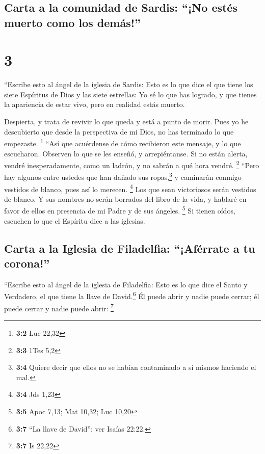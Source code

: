 \hypertarget{carta-a-la-comunidad-de-sardis-no-estuxe9s-muerto-como-los-demuxe1s}{%
\subsection{Carta a la comunidad de Sardis: ``¡No estés muerto como los
demás!''}\label{carta-a-la-comunidad-de-sardis-no-estuxe9s-muerto-como-los-demuxe1s}}

\hypertarget{section-2}{%
\section{3}\label{section-2}}

 ``Escribe esto al ángel de la iglesia de Sardis: Esto es
lo que dice el que tiene los siete Espíritus de Dios y las siete
estrellas: Yo sé lo que has logrado, y que tienes la apariencia de estar
vivo, pero en realidad estás muerto.

 Despierta, y trata de revivir lo que queda y está a punto
de morir. Pues yo he descubierto que desde la perspectiva de mi Dios, no
has terminado lo que empezaste. \footnote{\textbf{3:2} Luc 22,32}
 ``Así que acuérdense de cómo recibieron este mensaje, y
lo que escucharon. Observen lo que se les enseñó, y arrepiéntanse. Si no
están alerta, vendré inesperadamente, como un ladrón, y no sabrán a qué
hora vendré. \footnote{\textbf{3:3} 1Tes 5,2}  ``Pero hay
algunos entre ustedes que han dañado sus ropas,\footnote{\textbf{3:4}
  Quiere decir que ellos no se habían contaminado a sí mismos haciendo
  el mal.} y caminarán conmigo vestidos de blanco, pues así lo merecen.
\footnote{\textbf{3:4} Jds 1,23}  Los que sean victoriosos
serán vestidos de blanco. Y sus nombres no serán borrados del libro de
la vida, y hablaré en favor de ellos en presencia de mi Padre y de sus
ángeles. \footnote{\textbf{3:5} Apoc 7,13; Mat 10,32; Luc 10,20}
 Si tienen oídos, escuchen lo que el Espíritu dice a las
iglesias.

\hypertarget{carta-a-la-iglesia-de-filadelfia-afuxe9rrate-a-tu-corona}{%
\subsection{Carta a la Iglesia de Filadelfia: ``¡Aférrate a tu
corona!''}\label{carta-a-la-iglesia-de-filadelfia-afuxe9rrate-a-tu-corona}}

 ``Escribe esto al ángel de la iglesia de Filadelfia: Esto
es lo que dice el Santo y Verdadero, el que tiene la llave de
David.\footnote{\textbf{3:7} ``La llave de David'': ver Isaías 22:22.}
Él puede abrir y nadie puede cerrar; él puede cerrar y nadie puede
abrir: \footnote{\textbf{3:7} Is 22,22}

